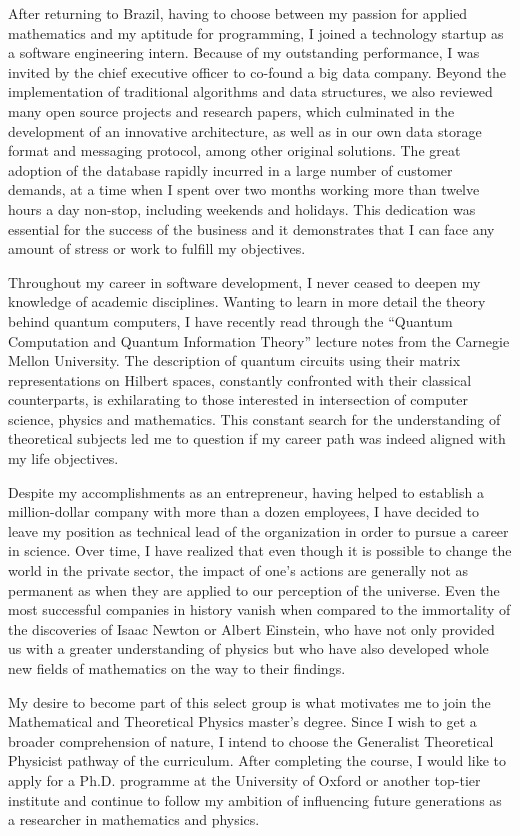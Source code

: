\documentclass[10pt]{article}
\begin{document}
After returning to Brazil, having to choose between my passion for applied mathematics and my aptitude for programming, I joined a technology startup as a software engineering intern. Because of my outstanding performance, I was invited by the chief executive officer to co-found a big data company. Beyond the implementation of traditional algorithms and data structures, we also reviewed many open source projects and research papers, which culminated in the development of an innovative architecture, as well as in our own data storage format and messaging protocol, among other original solutions. The great adoption of the database rapidly incurred in a large number of customer demands, at a time when I spent over two months working more than twelve hours a day non-stop, including weekends and holidays. This dedication was essential for the success of the business and it demonstrates that I can face any amount of stress or work to fulfill my objectives.

Throughout my career in software development, I never ceased to deepen my knowledge of academic disciplines. Wanting to learn in more detail the theory behind quantum computers, I have recently read through the ``Quantum Computation and Quantum Information Theory'' lecture notes from the Carnegie Mellon University. The description of quantum circuits using their matrix representations on Hilbert spaces, constantly confronted with their classical counterparts, is exhilarating to those interested in intersection of computer science, physics and mathematics. This constant search for the understanding of theoretical subjects led me to question if my career path was indeed aligned with my life objectives.

Despite my accomplishments as an entrepreneur, having helped to establish a million-dollar company with more than a dozen employees, I have decided to leave my position as technical lead of the organization in order to pursue a career in science. Over time, I have realized that even though it is possible to change the world in the private sector, the impact of one's actions are generally not as permanent as when they are applied to our perception of the universe. Even the most successful companies in history vanish when compared to the immortality of the discoveries of Isaac Newton or Albert Einstein, who have not only provided us with a greater understanding of physics but who have also developed whole new fields of mathematics on the way to their findings.

My desire to become part of this select group is what motivates me to join the Mathematical and Theoretical Physics master's degree. Since I wish to get a broader comprehension of nature, I intend to choose the Generalist Theoretical Physicist pathway of the curriculum. After completing the course, I would like to apply for a Ph.D. programme at the University of Oxford or another top-tier institute and continue to follow my ambition of influencing future generations as a researcher in mathematics and physics.
\end{document}

